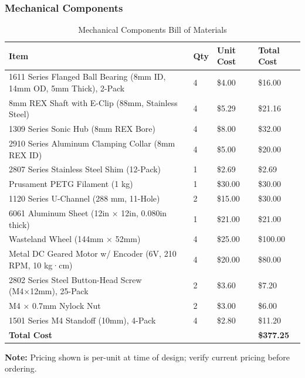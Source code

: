 {\subsubsection{Mechanical Components}
\begin{table}[H]
\centering
\caption{Mechanical Components Bill of Materials}
\label{tab:bom-mechanical}
\small
\begin{tabular}{@{}p{}p{}p{}p{}@{}}
\toprule
\textbf{Item} & \textbf{Qty} & \textbf{Unit Cost} & \textbf{Total Cost} \\ 
\midrule
1611 Series Flanged Ball Bearing (8mm ID, 14mm OD, 5mm Thick), 2-Pack & 4 & \$4.00 & \$16.00 \\
8mm REX Shaft with E-Clip (88mm, Stainless Steel) & 4 & \$5.29 & \$21.16 \\
1309 Series Sonic Hub (8mm REX Bore) & 4 & \$8.00 & \$32.00 \\
2910 Series Aluminum Clamping Collar (8mm REX ID) & 4 & \$5.00 & \$20.00 \\
2807 Series Stainless Steel Shim (12-Pack) & 1 & \$2.69 & \$2.69 \\
Prusament PETG Filament (1 kg) & 1 & \$30.00 & \$30.00 \\
1120 Series U-Channel (288 mm, 11-Hole) & 2 & \$15.00 & \$30.00 \\
6061 Aluminum Sheet (12in × 12in, 0.080in thick) & 1 & \$21.00 & \$21.00 \\
Wasteland Wheel (144mm × 52mm) & 4 & \$25.00 & \$100.00 \\
Metal DC Geared Motor w/ Encoder (6V, 210 RPM, 10 kg·cm) & 4 & \$20.00 & \$80.00 \\
2802 Series Steel Button-Head Screw (M4×12mm), 25-Pack & 2 & \$3.60 & \$7.20 \\
M4 × 0.7mm Nylock Nut & 2 & \$3.00 & \$6.00 \\
1501 Series M4 Standoff (10mm), 4-Pack & 4 & \$2.80 & \$11.20 \\
\midrule
\textbf{Total Cost} &  &  & \textbf{\$377.25} \\
\bottomrule
\end{tabular}
\end{table}


}%

\textbf{Note:} Pricing shown is per-unit at time of design;
verify current pricing before ordering.
